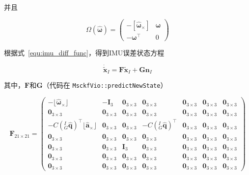 \documentclass[12pt,a4paper]{article}
\begin{document}
并且

\begin{equation*}
\Omega\left(\hat{\boldsymbol{\omega}}\right) = 
\begin{pmatrix}
-[\hat{\boldsymbol{\omega}}_\times] & \boldsymbol{\omega} \\
-\boldsymbol{\omega}^\top & 0
\end{pmatrix}
\end{equation*}

根据式~\eqref{equ:imu_diff_func}，得到IMU误差状态方程

\begin{equation}
\dot{\tilde{\mathbf{x}}}_I = 
\mathbf{F} \tilde{\mathbf{x}}_I + 
\mathbf{G} \mathbf{n}_I
\end{equation}

其中，$\mathbf{F}$和$\mathbf{G}$（代码在 \verb|MsckfVio::predictNewState|）

\begin{equation*}
\mathbf{F}_{21 \times 21} = 
\begin{pmatrix}
-\lfloor\hat{\boldsymbol{\omega}}{}_{\times}\rfloor & -\mathbf{I}_3 & 
\mathbf{0}_{3\times 3} & \mathbf{0}_{3\times 3} & \mathbf{0}_{3\times 3} & \mathbf{0}_{3\times 3} & \mathbf{0}_{3\times 3} \\
\mathbf{0}_{3\times 3} & \mathbf{0}_{3\times 3} & \mathbf{0}_{3\times 3} & 
\mathbf{0}_{3\times 3} & \mathbf{0}_{3\times 3} & \mathbf{0}_{3\times 3} & \mathbf{0}_{3\times 3} \\
-C\left({}^I_G\hat{\mathbf{q}}\right)^\top\lfloor\hat{\mathbf{a}}{}_{\times}\rfloor & 
\mathbf{0}_{3\times 3} & \mathbf{0}_{3\times 3} & 
-C\left({}^I_G\hat{\mathbf{q}}\right)^\top & \mathbf{0}_{3\times 3} & \mathbf{0}_{3\times 3} & \mathbf{0}_{3\times 3} \\
\mathbf{0}_{3\times 3} & \mathbf{0}_{3\times 3} & \mathbf{0}_{3\times 3} & 
\mathbf{0}_{3\times 3} & \mathbf{0}_{3\times 3} & \mathbf{0}_{3\times 3} & \mathbf{0}_{3\times 3} \\
\mathbf{0}_{3\times 3} & \mathbf{0}_{3\times 3} & \mathbf{I}_3 & 
\mathbf{0}_{3\times 3} & \mathbf{0}_{3\times 3} & \mathbf{0}_{3\times 3} & \mathbf{0}_{3\times 3} \\
\mathbf{0}_{3\times 3} & \mathbf{0}_{3\times 3} & \mathbf{0}_{3\times 3} & 
\mathbf{0}_{3\times 3} & \mathbf{0}_{3\times 3} & \mathbf{0}_{3\times 3} & \mathbf{0}_{3\times 3} \\
\mathbf{0}_{3\times 3} & \mathbf{0}_{3\times 3} & \mathbf{0}_{3\times 3} & 
\mathbf{0}_{3\times 3} & \mathbf{0}_{3\times 3} & \mathbf{0}_{3\times 3} & \mathbf{0}_{3\times 3}
\end{pmatrix}
\end{equation*}
\end{document}
